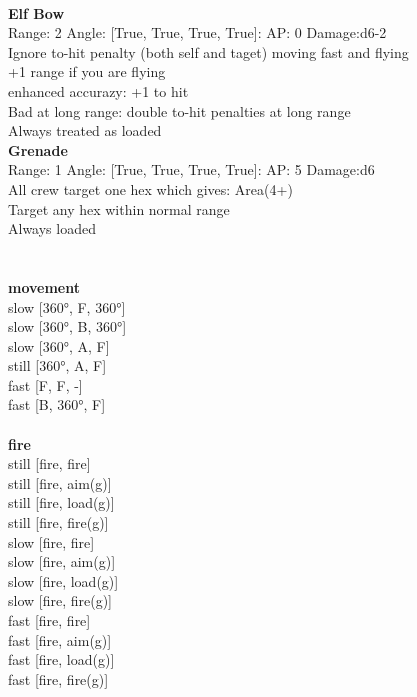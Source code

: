 \ \\
{\bf Elf Bow } \\



Range: 2  Angle: [True, True, True, True]: AP: 0 Damage:d6-2 \\
Ignore to-hit penalty (both self and taget) moving fast and flying\\ 
+1 range if you are flying\\ 
enhanced accurazy: +1 to hit\\ 
Bad at long range: double to-hit penalties at long range\\ 
Always treated as loaded\\ 




{\bf Grenade } \\



Range: 1  Angle: [True, True, True, True]: AP: 5 Damage:d6 \\
All crew target one hex which gives: Area(4+)\\ 
Target any hex within normal range\\ 
Always loaded\\ 




 
\ \\



\ \\ {\bf movement } \\
slow [360°, F, 360°] \\
slow [360°, B, 360°] \\
slow [360°, A, F] \\
still [360°, A, F] \\
fast [F, F, -] \\
fast [B, 360°, F] \\
\ \\ {\bf fire } \\
still [fire, fire] \\
still [fire, aim(g)] \\
still [fire, load(g)] \\
still [fire, fire(g)] \\
slow [fire, fire] \\
slow [fire, aim(g)] \\
slow [fire, load(g)] \\
slow [fire, fire(g)] \\
fast [fire, fire] \\
fast [fire, aim(g)] \\
fast [fire, load(g)] \\
fast [fire, fire(g)] \\


